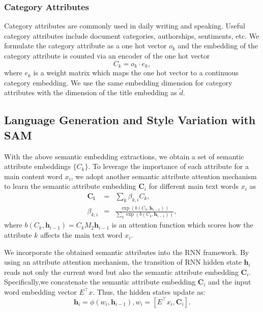 \documentclass[a4paper]{article}
\newcommand{\method}{\xspace{SAM}}
\begin{document}
\subsubsection{Category Attributes}
Category attributes are commonly used in daily writing and speaking. Useful category attributes include document categories, authorships, sentiments, etc. We formulate the category attribute as a one hot vector $o_k$ and the embedding of the category attribute is counted via an encoder of the one hot vector
\begin{equation}
C_k=o_k\cdot e_k,
\end{equation}
 where $e_k$ is a weight matrix which maps the one hot vector to a continuous category embedding.
We use the same embedding dimension for category attributes with the dimension of the title embedding as $\tilde{d}$.
\subsection{Language Generation and Style Variation with \method}
With the above semantic embedding extractions, we obtain a set of semantic attribute embeddings $\{C_{k}\}$.
To leverage the importance of each attribute for a main content word $x_{i}$, we adopt another semantic attribute attention mechanism to learn the semantic attribute embedding $\mathbf{C}_{i}$ for different main text words $x_{i}$ as
\begin{eqnarray}
\mathbf{C_{i}}&=&\sum_{k}\beta_{k,i}C_k,\\
\beta_{k,i}&=&\frac{\exp (b(C_{k},\mathbf{h}_{i-1}))}{\sum_{k}\exp (b(C_{k},\mathbf{h}_{i-1}))},
\end{eqnarray}
where $b(C_{k},\mathbf{h}_{i-1})=C_{k}M_{2}\mathbf{h}_{i-1}$ is an attention function which scores how the attribute $k$ affects the main text word $x_{i}$.

We incorporate the obtained semantic attributes into the RNN framework.
By using an attribute attention mechanism, the transition of RNN hidden state $\mathbf{h}_{i}$ reads not only the current word but also the semantic attribute embedding $\mathbf{C}_{i}$.
Specifically,we concatenate the semantic attribute embedding $\mathbf{C}_{i}$ and the input word embedding vector $E^{\top}x$. Thus, the hidden states update as:
\begin{equation}
\mathbf{h}_{i}=\phi(w_{i},\mathbf{h}_{i-1}), w_{i}=[E^{\top}x_i, \mathbf{C}_{i}].
\end{equation}
\end{document}
